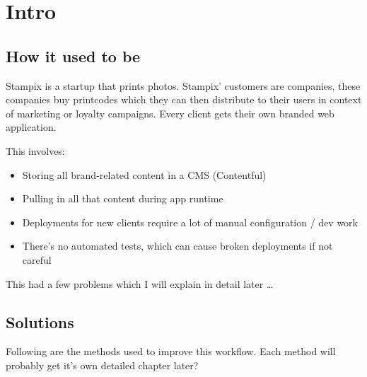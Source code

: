 \chapter{Intro} %

\label{Chapter1} %


\newcommand{\keyword}[1]{\textbf{#1}}
\newcommand{\tabhead}[1]{\textbf{#1}}
\newcommand{\code}[1]{\texttt{#1}}
\newcommand{\file}[1]{\texttt{\bfseries#1}}
\newcommand{\option}[1]{\texttt{\itshape#1}}


\section{How it used to be}

Stampix is a startup that prints photos. Stampix' customers are companies, these companies buy printcodes which they can then distribute to their users in context of marketing or loyalty campaigns. Every client gets their own branded web application.

This involves:

\begin{itemize}
	\item Storing all brand-related content in a CMS (Contentful)
	\item Pulling in all that content during app runtime
	\item Deployments for new clients require a lot of manual configuration / dev work
	\item There's no automated tests, which can cause broken deployments if not careful
\end{itemize}

This had a few problems which I will explain in detail later \ldots


\section{Solutions}

Following are the methods used to improve this workflow. Each method will probably get it's own detailed chapter later?

